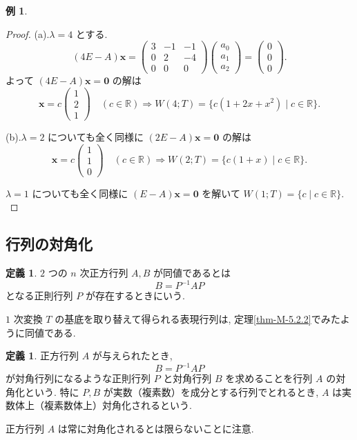 \documentclass[dvipdfmx,a4paper,11pt]{article} %
\theoremstyle{definition}
\newtheorem{defn}[thm]{定義}
\newtheorem{eg}[thm]{例}
\begin{document}
\begin{eg}
\begin{proof}
(a).\(\lambda=4\) とする.
\[
(4E-A)\bm{x}=
\begin{pmatrix}
3&-1&-1\\
0&2&-4\\
0&0&0
\end{pmatrix}
\begin{pmatrix}
a_0\\
a_1\\
a_2
\end{pmatrix}
=
\begin{pmatrix}
0\\
0\\
0
\end{pmatrix}.
\]
よって \((4E-A)\bm{x}=\bm{0}\) の解は
\[
\bm{x}=c
\begin{pmatrix}
1\\
2\\
1
\end{pmatrix}
\quad(c\in\mathbb{R})
\Rightarrow
W(4;T)
=
\{c(1+2x+x^2)\mid c\in\mathbb{R}\}.
\]

(b).\(\lambda=2\) についても全く同様に \((2E-A)\bm{x}=\bm{0}\) の解は
\[
\bm{x}=c
\begin{pmatrix}
1\\
1\\
0
\end{pmatrix}
\quad(c\in\mathbb{R})
\Rightarrow
W(2;T)
=
\{c(1+x)\mid c\in\mathbb{R}\}.
\]

\(\lambda=1\) についても全く同様に \((E-A)\bm{x}=\bm{0}\) を解いて
\(
W(1;T)=\{c\mid c\in\mathbb{R}\}.
\)
\end{proof}
\end{eg}


\subsection{行列の対角化 \cite[5.4節]{M}}

\begin{defn}%
\(2\) つの \(n\) 次正方行列 \(A,B\) が同値であるとは
\[
B=P^{-1}AP
\]
となる正則行列 \(P\) が存在するときにいう.
\end{defn}
\(1\) 次変換 \(T\) の基底を取り替えて得られる表現行列は, 定理\ref{thm-M-5.2.2}でみたように同値である.

\begin{defn}%
正方行列 \(A\) が与えられたとき,
\[
B=P^{-1}AP 
\]
が対角行列になるような正則行列 \(P\) と対角行列 \(B\) を求めることを行列 \(A\) の対角化という.
特に \(P,B\) が実数（複素数）を成分とする行列でとれるとき, \(A\) は実数体上（複素数体上）対角化されるという.
\end{defn}
正方行列 \(A\) は常に対角化されるとは限らないことに注意.
\end{document}
